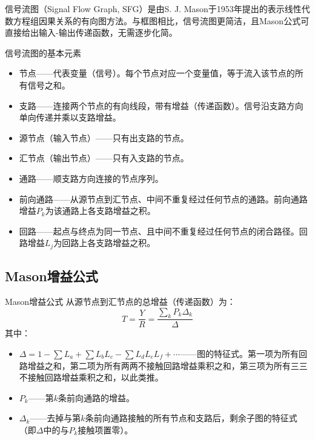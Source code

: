 信号流图（Signal Flow Graph, SFG）是由S. J. Mason于1953年提出的表示线性代数方程组因果关系的有向图方法。与框图相比，信号流图更简洁，且Mason公式可直接给出输入-输出传递函数，无需逐步化简。

\begin{mydefinition}{信号流图的基本元素}
\begin{itemize}
\item 节点——代表变量（信号）。每个节点对应一个变量值，等于流入该节点的所有信号之和。
\item 支路——连接两个节点的有向线段，带有增益（传递函数）。信号沿支路方向单向传递并乘以支路增益。
\item 源节点（输入节点）——只有出支路的节点。
\item 汇节点（输出节点）——只有入支路的节点。
\item 通路——顺支路方向连接的节点序列。
\item 前向通路——从源节点到汇节点、中间不重复经过任何节点的通路。前向通路增益$P_k$为该通路上各支路增益之积。
\item 回路——起点与终点为同一节点、且中间不重复经过任何节点的闭合路径。回路增益$L_j$为回路上各支路增益之积。
\end{itemize}
\end{mydefinition}

\subsection{Mason增益公式}

\begin{myTheorem}{Mason增益公式}
从源节点到汇节点的总增益（传递函数）为：
\[
T = \frac{Y}{R} = \frac{\sum_{k} P_k \Delta_k}{\Delta}
\]
其中：
\begin{itemize}
\item $\Delta = 1 - \sum L_a + \sum L_b L_c - \sum L_d L_e L_f + \cdots$——图的特征式。第一项为所有回路增益之和，第二项为所有两两不接触回路增益乘积之和，第三项为所有三三不接触回路增益乘积之和，以此类推。
\item $P_k$——第$k$条前向通路的增益。
\item $\Delta_k$——去掉与第$k$条前向通路接触的所有节点和支路后，剩余子图的特征式（即$\Delta$中的与$P_k$接触项置零）。
\end{itemize}
\end{myTheorem}

